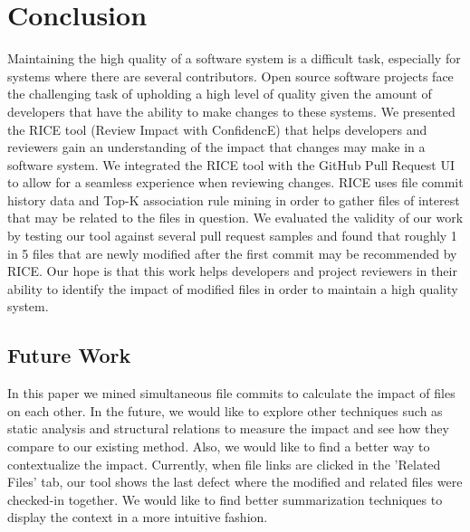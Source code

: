 
\section{Conclusion}
\label{sec:conclusion}

Maintaining the high quality of a software system is a difficult task, especially for systems where there are several contributors. Open source software projects face the challenging task of upholding a high level of quality given the amount of developers that have the ability to make changes to these systems. We presented the RICE tool (Review Impact with ConfidencE) that helps developers and reviewers gain an understanding of the impact that changes may make in a software system. We integrated the RICE tool with the GitHub Pull Request UI to allow for a seamless experience when reviewing changes. RICE uses file commit history data and Top-K association rule mining in order to gather files of interest that may be related to the files in question. We evaluated the validity of our work by testing our tool against several pull request samples and found that roughly 1 in 5 files that are newly modified after the first commit may be recommended by RICE. Our hope is that this work helps developers and project reviewers in their ability to identify the impact of modified files in order to maintain a high quality system.\\
\subsection{Future Work}
In this paper we mined simultaneous file commits to calculate the impact of files on each other. In the future, we would like to explore other techniques such as static analysis and structural relations to measure the impact and see how they compare to our existing method. Also, we would like to find a better way to contextualize the impact. Currently, when file links are clicked in the 'Related Files' tab, our tool shows the last defect where the modified and related files were checked-in together. We would like to find better summarization techniques to display the context in a more intuitive fashion.


